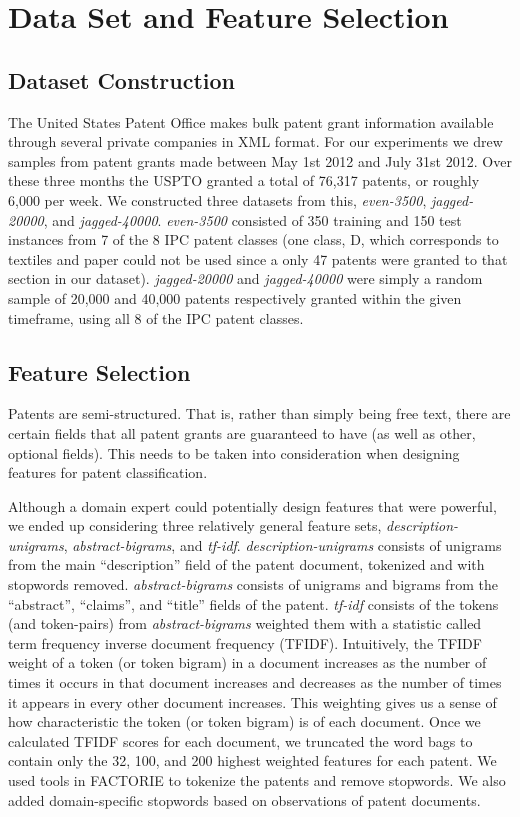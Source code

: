 \section{Data Set and Feature Selection}

\subsection{Dataset Construction}
\indent
The United States Patent Office makes bulk patent grant information available through several private companies\cite{USPTO:2013:patent-catalog} in XML format\cite{USPTO:2013:dtd}. For our experiments we drew samples from patent grants made between May 1st 2012 and July 31st 2012. Over these three months the USPTO granted a total of 76,317 patents, or roughly 6,000 per week. We constructed three datasets from this, \emph{even-3500}, \emph{jagged-20000}, and \emph{jagged-40000}. \emph{even-3500} consisted of 350 training and 150 test instances from 7 of the 8 IPC patent classes (one class, D, which corresponds to textiles and paper could not be used since a only 47 patents were granted to that section in our dataset). \emph{jagged-20000} and \emph{jagged-40000} were simply a random sample of 20,000 and 40,000 patents respectively granted within the given timeframe, using all 8 of the IPC patent classes.

\subsection{Feature Selection}
\indent
Patents are semi-structured. That is, rather than simply being free text, there are certain fields that all patent grants are guaranteed to have (as well as other, optional fields). This needs to be taken into consideration when designing features for patent classification. 

Although a domain expert could potentially design features that were powerful, we ended up considering three relatively general feature sets, \emph{description-unigrams}, \emph{abstract-bigrams}, and \emph{tf-idf}. \emph{description-unigrams} consists of unigrams from the main ``description'' field of the patent document, tokenized and with stopwords removed. \emph{abstract-bigrams} consists of unigrams and bigrams from the ``abstract'', ``claims'', and ``title'' fields of the patent. \emph{tf-idf} consists of the tokens (and token-pairs) from \emph{abstract-bigrams} weighted them with a statistic called term frequency inverse document frequency (TFIDF)\cite{manning:2008:IR}. Intuitively, the TFIDF weight of a token (or token bigram) in a document increases as the number of times it occurs in that document increases and decreases as the number of times it appears in every other document increases. This weighting gives us a sense of how characteristic the token (or token bigram) is of each document. Once we calculated TFIDF scores for each document, we truncated the word bags to contain only the 32, 100, and 200 highest weighted features for each patent. We used tools in FACTORIE\cite{mccallum09:factorie:} to tokenize the patents and remove stopwords. We also added domain-specific stopwords based on observations of patent documents. 

